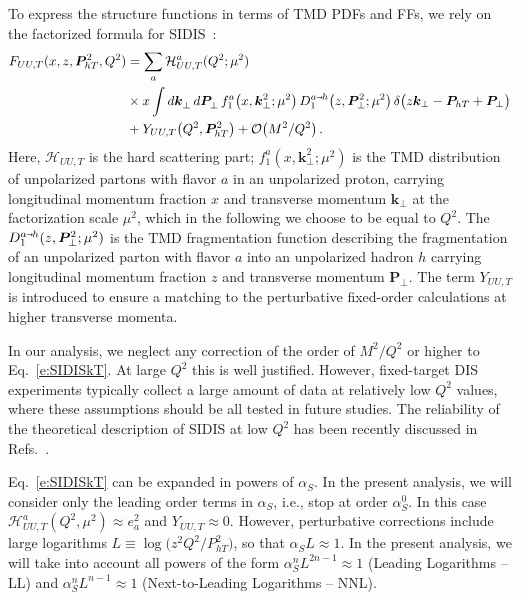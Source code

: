 \documentclass[aps,preprintnumbers,showpacs,nofootinbib,superscriptaddress,floatfix]{revtex4}
\newcommand{\smarrow}{\mbox{\raisebox{-4.5pt}[0pt][0pt]{$\hspace{-1pt} 
		\vec{\phantom{v}}$}}}
\newcommand{\T}{\perp}
\newcommand{\Tperp}{T}
\begin{document}
To express the structure functions in terms of TMD PDFs and FFs, 
we rely on the factorized formula 
for SIDIS~\cite{Collins:1981uk,Collins:1984kg,Ji:2002aa,Ji:2004wu,%
Collins:2011zzd,Aybat:2011zv,GarciaEchevarria:2011rb,Echevarria:2012pw,%
Collins:2012uy}:  
\begin{align}
\label{e:SIDISkT}
   F_{UU,T}(x,z, \bm{P}_{h \Tperp}^2, Q^2) &= \sum_a \mathcal{H}_{UU,T}^{a}(Q^2;\mu^2) \\ 
      &\times x \int d\bm{k}_\T^{} \, d\bm{P}_\T^{} \,  f_1^a\big(x,\bm{k}_{\T}^2; \mu^2 \big) \, D_{1}^{a\smarrow h}\big(z,\bm{P}_{\T}^2; \mu^2 \big) \,
      \delta \big(z {\bm k}_{\T} - {\bm P}_{h \Tperp} + {\bm P}_{\T}\big)
\nonumber\\&
\nonumber + Y_{UU,T}\big(Q^2, \bm{P}_{h\Tperp}^2\big) + \mathcal{O}\big(M^2/Q^2\big) \, .
\end{align} 
Here, $\mathcal{H}_{UU,T}$ is the hard scattering part; $f_1^a(x,\bm{k}_{\T}^2;
\mu^2)$ is the TMD distribution of unpolarized partons with flavor $a$ in an unpolarized
proton, carrying longitudinal momentum fraction $x$ and transverse momentum
$\bm{k}_\T$ at the factorization scale $\mu^2$, which in the following we
choose to be equal to $Q^2$.  The $D_1^{a\smarrow h}(z, \bm{P}_{\T}^2;
\mu^2)$ is the TMD fragmentation function describing the fragmentation of an unpolarized parton with flavor $a$ into
an unpolarized hadron $h$ carrying longitudinal momentum fraction $z$ and
transverse momentum 
$\bm{P}_\T$. The term $Y_{UU,T}$ is introduced to ensure a matching
to the perturbative fixed-order calculations at higher transverse momenta. 

In our analysis, we neglect any correction of the order of $M^2/Q^2$ or higher
to  Eq.~\eqref{e:SIDISkT}.
At large $Q^2$ this is well justified. 
However, fixed-target DIS experiments typically 
collect a large amount of data
at relatively low $Q^2$ values, where these assumptions
should be all tested in future studies. The reliability
of the theoretical description of SIDIS at low $Q^2$ has been recently
discussed in Refs.~\cite{Boglione:2016bph,Moffat:2017sha}.
 
Eq.~\eqref{e:SIDISkT} can be expanded in powers
of $\alpha_S$. In the present analysis, we 
will consider only the leading order terms in $\alpha_S$, i.e., stop at
order $\alpha_S^0$. In this case 
$\mathcal{H}^a_{UU,T} (Q^2, \mu^2) \approx e_a^2$
and $Y_{UU,T}\approx 0$. 
However, perturbative corrections include large logarithms $L \equiv
\log\big(z^2 Q^2/P_{hT}^2\big)$, so that $\alpha_S L \approx 1$.
In the present analysis, we will take into account all 
powers of the form $\alpha_S^n L^{2n-1} \approx 1$ (Leading Logarithms --LL) 
and 
$\alpha_S^n L^{n-1} \approx 1$ (Next-to-Leading Logarithms -- NNL).
\end{document}
